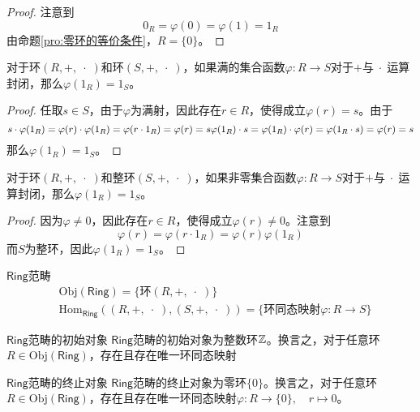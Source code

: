 \begin{proof}
	注意到
	$$
	0_R=\varphi(0)=\varphi(1)=1_R
	$$
	由命题\ref{pro:零环的等价条件}，$R=\{0\}$。
\end{proof}

\begin{proposition}
	对于环$(R,+,\;\cdot\;)$和环$(S,+,\;\cdot\;)$，如果满的集合函数$\varphi:R\to S$对于$+$与$\;\cdot\;$运算封闭，那么$\varphi(1_R)=1_S$。
\end{proposition}

\begin{proof}
	任取$s\in S$，由于$\varphi$为满射，因此存在$r\in R$，使得成立$\varphi(r)=s$。由于
	$$
	s\cdot\varphi(1_R)=\varphi(r)\cdot\varphi(1_R)=\varphi(r\cdot1_R)=\varphi(r)=s\\
	\varphi(1_R)\cdot s=\varphi(1_R)\cdot\varphi(r)=\varphi(1_R\cdot s)=\varphi(r)=s
	$$
	那么$\varphi(1_R)=1_S$。
\end{proof}

\begin{proposition}
	对于环$(R,+,\;\cdot\;)$和整环$(S,+,\;\cdot\;)$，如果非零集合函数$\varphi:R\to S$对于$+$与$\;\cdot\;$运算封闭，那么$\varphi(1_R)=1_S$。
\end{proposition}

\begin{proof}
	因为$\varphi\ne0$，因此存在$r\in R$，使得成立$\varphi(r)\ne0$。注意到
	$$
	\varphi(r)=\varphi(r\cdot 1_R)=\varphi(r)\varphi(1_R)
	$$
	而$S$为整环，因此$\varphi(1_R)=1_S$。
\end{proof}

\begin{definition}{$\mathsf{Ring}$范畴}
	\begin{align*}
		&\mathrm{Obj}(\mathsf{Ring})=\{ \text{环} (R,+,\;\cdot\;) \}\\
		&\mathrm{Hom}_\mathsf{Ring}((R,+,\;\cdot\;),(S,+,\;\cdot\;))=\{ \text{环同态映射}\varphi:R\to S\}
	\end{align*}
\end{definition}

\begin{proposition}{$\mathsf{Ring}$范畴的初始对象}
	$\mathsf{Ring}$范畴的初始对象为整数环$\mathbb{Z}$。换言之，对于任意环$R\in \mathrm{Obj}(\mathsf{Ring})$，存在且存在唯一环同态映射
\end{proposition}

\begin{proposition}{$\mathsf{Ring}$范畴的终止对象}
	$\mathsf{Ring}$范畴的终止对象为零环$\{0\}$。换言之，对于任意环$R\in \mathrm{Obj}(\mathsf{Ring})$，存在且存在唯一环同态映射$\varphi:R\to \{0\},\quad r\mapsto 0$。
\end{proposition}

